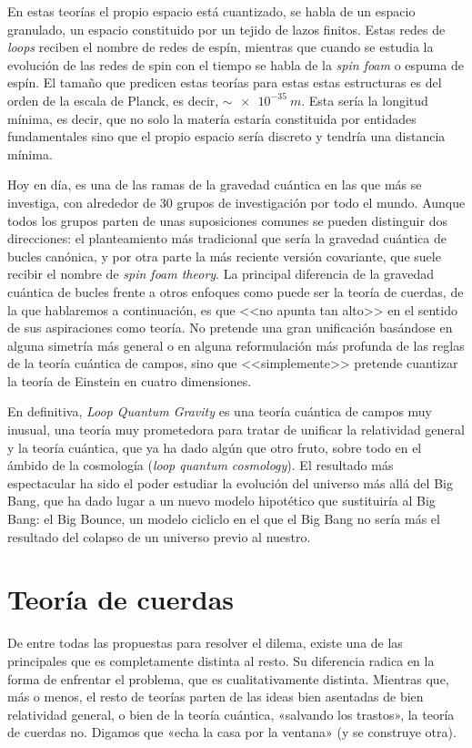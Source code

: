 \documentclass[11pt,a4paper,titlepage]{article}
\begin{document}
En estas teorías el propio espacio está cuantizado, se habla de un espacio granulado, un espacio constituido por  un tejido de lazos finitos. Estas redes de \emph{loops} reciben el nombre de redes de espín, mientras que cuando se estudia la evolución de las redes de spin con el tiempo se habla de la \emph{spin foam} o espuma de espín. El tamaño que predicen estas teorías para estas estas estructuras es del orden de la escala de Planck, es decir, $\sim\SI{e-35}{m}$. Esta sería la longitud mínima, es decir, que no solo la matería estaría constituida por entidades fundamentales sino que el propio espacio sería discreto y tendría una distancia mínima.

Hoy en día, es una de las ramas de la gravedad cuántica en las que más se investiga, con alrededor de 30 grupos de investigación por todo el mundo. Aunque todos los grupos parten de unas suposiciones comunes se pueden distinguir dos direcciones: el planteamiento más tradicional que sería la gravedad cuántica de bucles canónica, y por otra parte la más reciente versión covariante, que suele recibir el nombre de \emph{spin foam theory}. La principal diferencia de la gravedad cuántica de bucles frente a otros enfoques como puede ser la teoría de cuerdas, de la que hablaremos a continuación, es que <<no apunta tan alto>> en el sentido de sus aspiraciones como teoría. No pretende una gran unificación basándose en alguna simetría más general o en alguna reformulación más profunda de las reglas de la teoría cuántica de campos, sino que <<simplemente>> pretende cuantizar la teoría de Einstein en cuatro dimensiones.

En definitiva, \textit{Loop Quantum Gravity} es una teoría cuántica de campos muy inusual, una teoría muy prometedora para tratar de unificar la relatividad general y la teoría cuántica, que ya ha dado algún que otro fruto, sobre todo en el ámbido de la cosmología (\emph{loop quantum cosmology}). El resultado más espectacular ha sido el poder estudiar la evolución del universo más allá del Big Bang, que ha dado lugar a un nuevo modelo hipotético que sustituiría al Big Bang: el Big Bounce, un modelo cicliclo en el que el Big Bang no sería más el resultado del colapso de un universo previo al nuestro.

%
%
%
%
\newpage
\section{Teoría de cuerdas}

De entre todas las propuestas para resolver el dilema, existe una de las principales que es completamente distinta al resto. Su diferencia radica en la forma de enfrentar el problema, que es cualitativamente distinta. Mientras que, más o menos, el resto de teorías parten de las ideas bien asentadas de bien relatividad general, o bien de la teoría cuántica, «salvando los trastos», la teoría de cuerdas no. Digamos que «echa la casa por la ventana» (y se construye otra).
\end{document}
